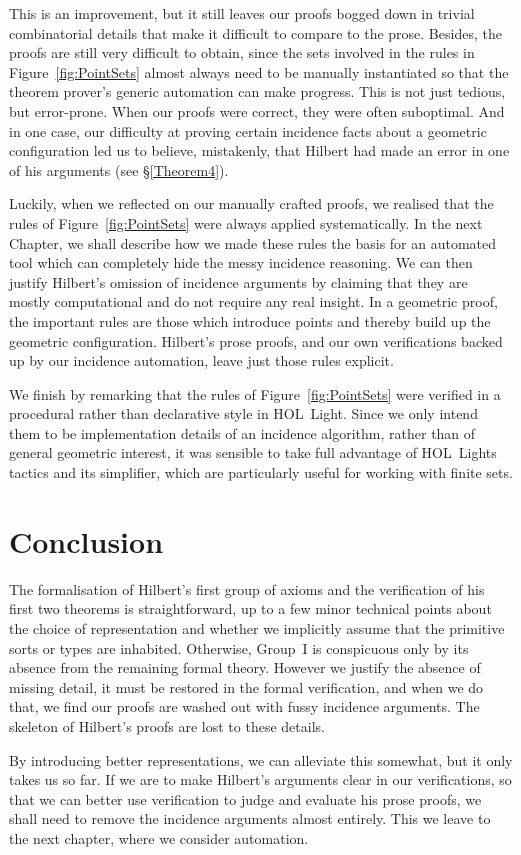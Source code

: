 This is an improvement, but it still leaves our proofs bogged down in trivial combinatorial details that make it difficult to compare to the prose. Besides, the proofs are still very difficult to obtain, since the sets involved in the rules in Figure~\ref{fig:PointSets} almost always need to be manually instantiated so that the theorem prover's generic automation can make progress. This is not just tedious, but error-prone. When our proofs were correct, they were often suboptimal. And in one case, our difficulty at proving certain incidence facts about a geometric configuration led us to believe, mistakenly, that Hilbert had made an error in one of his arguments (see \S\ref{Theorem4}).

Luckily, when we reflected on our manually crafted proofs, we realised that the rules of Figure~\ref{fig:PointSets} were always applied systematically. In the next Chapter, we shall describe how we made these rules the basis for an automated tool which can completely hide the messy incidence reasoning. We can then justify Hilbert's omission of incidence arguments by claiming that they are mostly computational and do not require any real insight. In a geometric proof, the important rules are those which introduce points and thereby build up the geometric configuration. Hilbert's prose proofs, and our own verifications backed up by our incidence automation, leave just those rules explicit.

We finish by remarking that the rules of Figure~\ref{fig:PointSets} were verified in a procedural rather than declarative style in HOL~Light. Since we only intend them to be implementation details of an incidence algorithm, rather than of general geometric interest, it was sensible to take full advantage of HOL~Lights tactics and its simplifier, which are particularly useful for working with finite sets.  

\section{Conclusion}
The formalisation of Hilbert's first group of axioms and the verification of his first two theorems is straightforward, up to a few minor technical points about the choice of representation and whether we implicitly assume that the primitive sorts or types are inhabited. Otherwise, Group~I is conspicuous only by its absence from the remaining formal theory. However we justify the absence of missing detail, it must be restored in the formal verification, and when we do that, we find our proofs are washed out with fussy incidence arguments. The skeleton of Hilbert's proofs are lost to these details. 

By introducing better representations, we can alleviate this somewhat, but it only takes us so far. If we are to make Hilbert's arguments clear in our verifications, so that we can better use verification to judge and evaluate his prose proofs, we shall need to remove the incidence arguments almost entirely. This we leave to the next chapter, where we consider automation.


